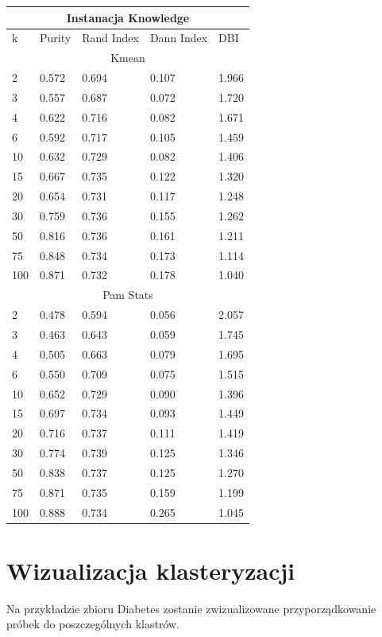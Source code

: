 \documentclass[12pt,a4paper]{article}
\begin{document}
\begin{tabular}{ |p{1.5cm}||p{2.5cm}|p{2.5cm}|p{2.5cm}|p{2.5cm}| }

\hline
\multicolumn{5}{|c|}{Instanacja Knowledge}\\
\hline
k &Purity & Rand Index & Dann Index & DBI \\
\hline
\hline
\multicolumn{5}{|c|}{Kmean}\\
\hline
2 & 0.572 & 0.694 & 0.107 & 1.966\\
3 & 0.557 & 0.687 & 0.072 & 1.720\\
4 & 0.622 & 0.716 & 0.082 & 1.671\\
6 & 0.592 & 0.717 & 0.105 & 1.459\\
10 & 0.632 & 0.729 & 0.082 & 1.406\\
15 & 0.667 & 0.735 & 0.122 & 1.320\\
20 & 0.654 & 0.731 & 0.117 & 1.248\\
30 & 0.759 & 0.736 & 0.155 & 1.262\\
50 & 0.816 & 0.736 & 0.161 & 1.211\\
75 & 0.848 & 0.734 & 0.173 & 1.114\\
100 & 0.871 & 0.732 & 0.178 & 1.040\\
\hline
\multicolumn{5}{|c|}{Pam Stats}\\
\hline
2 & 0.478 & 0.594 & 0.056 & 2.057\\
3 & 0.463 & 0.643 & 0.059 & 1.745\\
4 & 0.505 & 0.663 & 0.079 & 1.695\\
6 & 0.550 & 0.709 & 0.075 & 1.515\\
10 & 0.652 & 0.729 & 0.090 & 1.396\\
15 & 0.697 & 0.734 & 0.093 & 1.449\\
20 & 0.716 & 0.737 & 0.111 & 1.419\\
30 & 0.774 & 0.739 & 0.125 & 1.346\\
50 & 0.838 & 0.737 & 0.125 & 1.270\\
75 & 0.871 & 0.735 & 0.159 & 1.199\\
100 & 0.888 & 0.734 & 0.265 & 1.045\\
\hline
\end{tabular}


\section{Wizualizacja klasteryzacji}
Na przykładzie zbioru Diabetes zostanie zwizualizowane przyporządkowanie próbek do poszczególnych klastrów.
\end{document}
